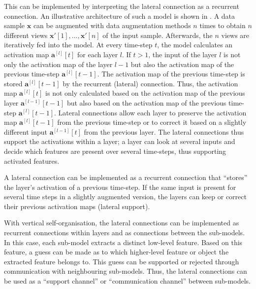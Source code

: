This can be implemented by interpreting the lateral connection as a recurrent connection.
An illustrative architecture of such a model is shown in .
A data sample $\boldsymbol{x}$ can be augmented with data augmentation methods $n$ times to obtain $n$ different views $\boldsymbol{x}'[1], ..., \boldsymbol{x}'[n]$ of the input sample.
Afterwards, the $n$ views are iteratively fed into the model.
At every time-step $t$, the model calculates an activation map $\boldsymbol{a}^{[l]}[t]$ for each layer $l$.
If $t>1$, the input of the layer $l$ is not only the activation map of the layer $l-1$ but also the activation map of the previous time-step $\boldsymbol{a}^{[l]}[t-1]$.
The activation map of the previous time-step is stored $\boldsymbol{a}^{[l]}[t-1]$ by the recurrent (lateral) connection.
Thus, the activation map $\boldsymbol{a}^{[l]}[t]$ is not only calculated based on the activation map of the previous layer $\boldsymbol{a}^{[l-1]}[t-1]$ but also based on the activation map of the previous time-step $\boldsymbol{a}^{[l]}[t-1]$.
Lateral connections allow each layer to preserve the activation map $\boldsymbol{a}^{[l]}[t-1]$ from the previous time-step or to correct it based on a slightly different input $\boldsymbol{a}^{[l-1]}[t]$ from the previous layer. The lateral connections thus support the activations within a layer; a layer can look at several inputs and decide which features are present over several time-steps, thus supporting activated features.

\begin{implementation}
	A lateral connection can be implemented as a recurrent connection that ``stores'' the layer's activation of a previous time-step.
	If the same input is present for several time steps in a slightly augmented version, the layers can keep or correct their previous activation maps (lateral support).
\end{implementation}

With vertical self-organisation, the lateral connections can be implemented as recurrent connections within layers and as connections between the sub-models.
In this case, each sub-model extracts a distinct low-level feature.
Based on this feature, a guess can be made as to which higher-level feature or object the extracted feature belongs to.
This guess can be supported or rejected through communication with neighbouring sub-models.
Thus, the lateral connections can be used as a ``support channel'' or ``communication channel'' between sub-models. 

